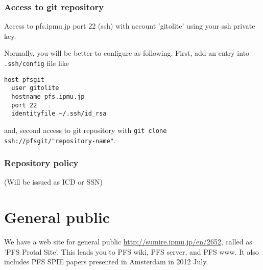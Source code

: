 \documentclass[a4paper,notitlepage]{article}
\begin{document}
\subsubsection{Access to git repository}

Access to pfs.ipmu.jp port 22 (ssh) with account 'gitolite' 
using your ssh private key. 

Normally, you will be better to configure as following. 
First, add an entry into {\tt .ssh/config} file like 

\begin{verbatim}
host pfsgit
  user gitolite
  hostname pfs.ipmu.jp
  port 22
  identityfile ~/.ssh/id_rsa
\end{verbatim}

and, second access to git repository with 
{\tt git clone ssh://pfsgit/"repository-name"}.

\subsubsection{Repository policy}

\tbd (Will be issued as ICD or SSN)


\section{General public}

We have a web site for general public \url{http://sumire.ipmu.jp/en/2652}, 
called as 'PFS Protal Site'.
This leads you to PFS wiki, PFS server, and PFS www.
It also includes PFS SPIE papers presented in Amsterdam in 2012 July.
\end{document}
